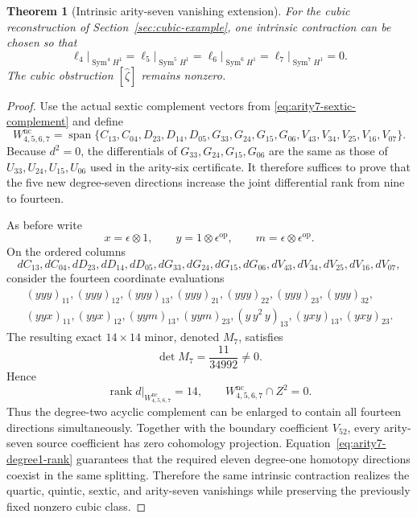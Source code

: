 \documentclass[11pt]{amsart}
\newtheorem{theorem}{Theorem}[section]
\newcommand{\Span}{\operatorname{span}}
\newcommand{\rank}{\operatorname{rank}}
\begin{document}
\begin{theorem}[Intrinsic arity-seven vanishing extension]\label{thm:intrinsic-ell7-vanish}
For the cubic reconstruction of Section~\ref{sec:cubic-example}, one intrinsic contraction can be chosen so that
\[
\boxed{
\ell_4\big|_{\operatorname{Sym}^4H^1}
=
\ell_5\big|_{\operatorname{Sym}^5H^1}
=
\ell_6\big|_{\operatorname{Sym}^6H^1}
=
\ell_7\big|_{\operatorname{Sym}^7H^1}
=0.
}
\]
The cubic obstruction $[\widehat\zeta]$ remains nonzero.
\end{theorem}

\begin{proof}
Use the actual sextic complement vectors from \eqref{eq:arity7-sextic-complement} and define
\[
W_{4,5,6,7}^{\mathrm{nc}}
=
\Span\{C_{13},C_{04},D_{23},D_{14},D_{05},G_{33},G_{24},G_{15},G_{06},
V_{43},V_{34},V_{25},V_{16},V_{07}\}.
\]
Because $d^2=0$, the differentials of $G_{33},G_{24},G_{15},G_{06}$ are the same as those of $U_{33},U_{24},U_{15},U_{06}$ used in the arity-six certificate.  It therefore suffices to prove that the five new degree-seven directions increase the joint differential rank from nine to fourteen.

As before write
\[
x=\epsilon\otimes1,\qquad y=1\otimes\epsilon^{\mathrm{op}},\qquad m=\epsilon\otimes\epsilon^{\mathrm{op}}.
\]
On the ordered columns
\[
dC_{13},dC_{04},dD_{23},dD_{14},dD_{05},dG_{33},dG_{24},dG_{15},dG_{06},
dV_{43},dV_{34},dV_{25},dV_{16},dV_{07},
\]
consider the fourteen coordinate evaluations
\[
\begin{gathered}
(yyy)_{11},(yyy)_{12},(yyy)_{13},(yyy)_{21},(yyy)_{22},(yyy)_{23},(yyy)_{32},\\
(yyx)_{11},(yyx)_{12},(yym)_{13},(yym)_{23},(y\,y^2\,y)_{13},(yxy)_{13},(yxy)_{23}.
\end{gathered}
\]
The resulting exact $14\times14$ minor, denoted $M_7$, satisfies
\begin{equation}\label{eq:arity7-minor}
\det M_7=\frac{11}{34992}\ne0.
\end{equation}
Hence
\[
\rank d\big|_{W_{4,5,6,7}^{\mathrm{nc}}}=14,
\qquad
W_{4,5,6,7}^{\mathrm{nc}}\cap Z^2=0.
\]
Thus the degree-two acyclic complement can be enlarged to contain all fourteen directions simultaneously.  Together with the boundary coefficient $V_{52}$, every arity-seven source coefficient has zero cohomology projection.  Equation~\eqref{eq:arity7-degree1-rank} guarantees that the required eleven degree-one homotopy directions coexist in the same splitting.  Therefore the same intrinsic contraction realizes the quartic, quintic, sextic, and arity-seven vanishings while preserving the previously fixed nonzero cubic class.
\end{proof}
\end{document}
